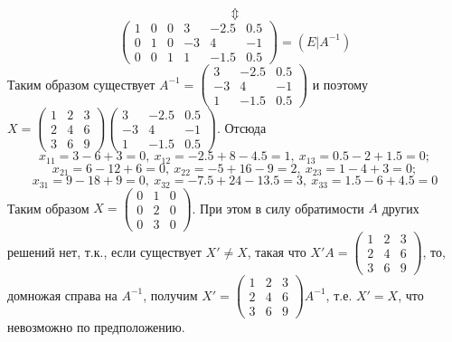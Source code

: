 \documentclass{article}
\begin{document}
$$\Updownarrow$$
$$\left(\begin{array}{ccc|ccc}1 & 0 & 0 & 3 & -2.5 & 0.5\\0 & 1 & 0 & -3 & 4 & -1\\0 & 0 & 1 & 1 & -1.5 & 0.5\end{array}\right)=(E|A^{-1})$$
Таким образом существует $A^{-1}=\left(\begin{array}{ccc}3 & -2.5 & 0.5\\-3 & 4 & -1\\1 & -1.5 & 0.5\end{array}\right)$ и поэтому
$X=\left(\begin{array}{rrr}1 & 2 & 3\\2 & 4 & 6\\3 & 6 & 9\end{array}\right)\left(\begin{array}{ccc}3 & -2.5 & 0.5\\-3 & 4 & -1\\1 & -1.5 & 0.5\end{array}\right)$. Отсюда
$$x_{11}=3-6+3=0,\ x_{12}=-2.5+8-4.5=1,\ x_{13}=0.5-2+1.5=0;$$
$$x_{21}=6-12+6=0,\ x_{22}=-5+16-9=2,\ x_{23}=1-4+3=0;$$
$$x_{31}=9-18+9=0,\ x_{32}=-7.5+24-13.5=3,\ x_{33}=1.5-6+4.5=0$$
Таким образом $X=\left(\begin{array}{rrr}0 & 1 & 0\\0 & 2 & 0\\0 & 3 & 0\end{array}\right)$. При этом в силу обратимости $A$ других решений нет, т.к., если существует $X'\not = X$, такая что $X'A=\left(\begin{array}{rrr}1 & 2 & 3\\2 & 4 & 6\\3 & 6 & 9\end{array}\right)$, то, домножая справа на $A^{-1}$, получим $X'=\left(\begin{array}{rrr}1 & 2 & 3\\2 & 4 & 6\\3 & 6 & 9\end{array}\right)A^{-1}$, т.е. $X'=X$, что невозможно по предположению.
\end{document}
